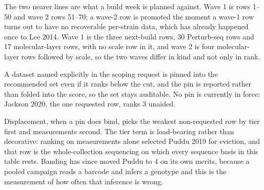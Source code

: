 The two nearer lines are what a build week is planned against. Wave 1 is rows 1--50 and
wave 2 rows 51--70; a wave-2 row is promoted the moment a wave-1 row turns out to have no
recoverable per-strain data, which has already happened once to Lee 2014. Wave 1 is the
three next-build rows, 30 Perturb-seq rows and 17 molecular-layer rows, with no scale row
in it, and wave 2 is four molecular-layer rows followed by scale, so the two waves differ
in kind and not only in rank.

A dataset named explicitly in the scoping request is pinned into the recommended set even
if it ranks below the cut, and the pin is reported rather than folded into the score, so
the set stays auditable. No pin is currently in force: Jackson 2020, the one requested row,
ranks 3 unaided.

Displacement, when a pin does bind, picks the weakest non-requested row by tier first and
measurements second. The tier term is load-bearing rather than decorative: ranking on
measurements alone selected Puddu 2019 for eviction, and that row is the whole-collection
sequencing on which every  sequence basis in this table rests. Banding has
since moved Puddu to 4 on its own merits, because a pooled campaign reads a barcode and
infers a genotype and this is the measurement of how often that inference is wrong.

